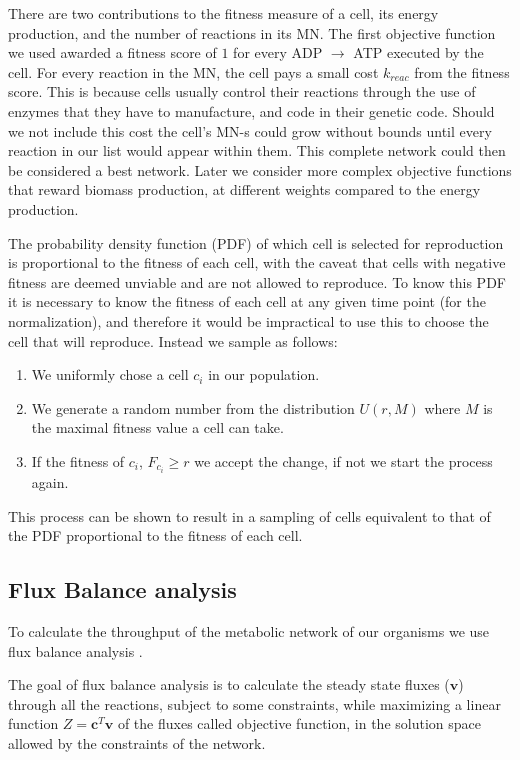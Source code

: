\documentclass[a4paper,12pt]{article}
\begin{document}
There are two contributions to the fitness measure of a cell, its energy production, and the number of reactions in its MN. The first objective function we used awarded a fitness score of $1$ for every ADP $\rightarrow$ ATP executed by the cell. For every reaction in the MN, the cell pays a small cost $k_{reac}$ from the fitness score. This is because cells usually control their reactions through the use of enzymes that they have to manufacture, and code in their genetic code. Should we not include this cost the cell's MN-s could grow without bounds until every reaction in our list would appear within them. This complete network could then be considered a best network. Later we consider more complex objective functions that reward biomass production, at different weights compared to the energy production. 

The probability density function (PDF) of which cell is selected for reproduction is proportional to the fitness of each cell, with the caveat that cells with negative fitness are deemed unviable and are not allowed to reproduce. To know this PDF it is necessary to know the fitness of each cell at any given time point (for the normalization), and therefore it would be impractical to use this to choose the cell that will reproduce. Instead we sample as follows: 
\begin{enumerate}
	\item We uniformly chose a cell $c_i$ in our population.
	\item We generate a random number from the distribution $U \left( r,M \right)$ where $M$ is the maximal fitness value a cell can take.
	\item If the fitness of $c_i$, $F_{c_i} \geq r$ we accept the change, if not we start the process again.
\end{enumerate}

This process can be shown to result in a sampling of cells equivalent to that of the PDF proportional to the fitness of each cell.


\subsection{Flux Balance analysis}
\label{sub:Flux Balance analysis}


	To calculate the throughput of the metabolic network of our organisms we use flux balance analysis \cite{whatisfluxbalance}. 	

	The goal of flux balance analysis is to calculate the steady state fluxes ($\mathbf{v}$) through all the reactions, subject to some constraints, while maximizing a linear function $Z=\mathbf{c}^T \mathbf{v}$ of the fluxes called objective function, in the solution space allowed by the constraints of the network.
\end{document}
